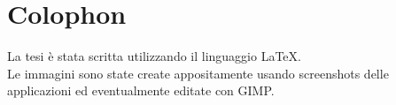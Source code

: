 %
%
\chapter*{Colophon}

La tesi è stata scritta utilizzando il linguaggio LaTeX.\\
Le immagini sono state create appositamente usando screenshots delle applicazioni ed eventualmente editate con GIMP.\\
